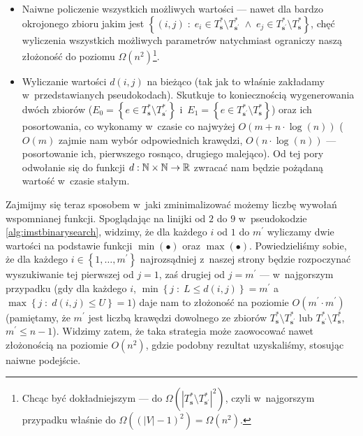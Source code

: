 \begin{itemize}
	\item Naiwne policzenie wszystkich możliwych wartości --- nawet dla bardzo okrojonego zbioru jakim jest $\left\{ \left( i, j \right) \; : \; e_{i} \in T^{\ast}_{\textbf{s}} \setminus T^{\ast}_{\textbf{s}^{\prime}} \; \wedge \; e_{j} \in T^{\ast}_{\textbf{s}^{\prime}} \setminus T^{\ast}_{\textbf{s}} \right\}$, chęć wyliczenia wszystkich możliwych parametrów natychmiast ograniczy naszą złożoność do poziomu $\Omega \left( n^{2} \right)$\footnote{Chcąc być dokładniejszym --- do $\Omega \left( \left| T^{\ast}_{\textbf{s}} \setminus T^{\ast}_{\textbf{s}^{\prime}} \right|^{2} \right)$, czyli w~najgorszym przypadku właśnie do $\Omega \left( \left( \left| V \right| - 1 \right)^{2} \right) = \Omega \left( n^{2} \right)$.}.
	\item Wyliczanie wartości $d \left( i, j \right)$ na bieżąco (tak jak to właśnie zakładamy w~przedstawianych pseudokodach). Skutkuje to koniecznością wygenerowania dwóch zbiorów ($E_{0} = \left\{ e \in T^{\ast}_{\textbf{s}} \setminus T^{\ast}_{\textbf{s}^{\prime}} \right\}$ i~$E_{1} = \left\{ e \in T^{\ast}_{\textbf{s}^{\prime}} \setminus T^{\ast}_{\textbf{s}} \right\}$) oraz ich posortowania, co wykonamy w~czasie co najwyżej $O \left( m + n \cdot \log \left( n \right) \right)$ ($O \left( m \right)$ zajmie nam wybór odpowiednich krawędzi, $O \left( n \cdot \log \left( n \right) \right)$ --- posortowanie ich, pierwszego rosnąco, drugiego malejąco). Od tej pory odwołanie się do funkcji $d: \mathbb{N} \times \mathbb{N} \rightarrow \mathbb{R}$ zwracać nam będzie pożądaną wartość w~czasie stałym.
\end{itemize}

Zajmijmy się teraz sposobem w~jaki zminimalizować możemy liczbę wywołań wspomnianej funkcji. Spoglądając na linijki od $2$ do $9$ w~pseudokodzie \ref{alg:imstbinarysearch}, widzimy, że dla każdego $i$ od $1$ do $m^{\prime}$ wyliczamy dwie wartości na podstawie funkcji $\min \left( \bullet \right)$ oraz $\max \left( \bullet \right)$. Powiedzieliśmy sobie, że dla każdego $i \in \left\{ 1, \dots, m^{\prime} \right\}$ najrozsądniej z~naszej strony będzie rozpoczynać wyszukiwanie tej pierwszej od $j = 1$, zaś drugiej od $j = m^{\prime}$ --- w~najgorszym przypadku (gdy dla każdego $i$, $\min \left\{ j \; : \; L \leqslant d \left( i, j \right) \right\} = m^{\prime}$ a~$\max \left\{ j \; : \; d \left( i, j \right) \leqslant U \right\} = 1$) daje nam to złożoność na poziomie $O \left( m^{\prime} \cdot m^{\prime} \right)$ (pamiętamy, że $m^{\prime}$ jest liczbą krawędzi dowolnego ze zbiorów $T^{\ast}_{\textbf{s}} \setminus T^{\ast}_{\textbf{s}^{\prime}}$ lub $T^{\ast}_{\textbf{s}^{\prime}} \setminus T^{\ast}_{\textbf{s}}$, $m^{\prime} \leqslant n - 1$). Widzimy zatem, że taka strategia może zaowocować nawet złożonością na poziomie $O \left( n^{2} \right)$, gdzie podobny rezultat uzyskaliśmy, stosując naiwne podejście.

